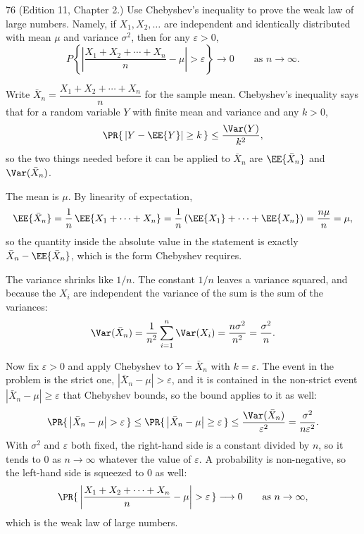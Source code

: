 \documentclass[11pt]{article}
\begin{document}

\begin{problem}{76}
  (Edition 11, Chapter 2.) Use Chebyshev's inequality to prove the weak law of
  large numbers. Namely, if $X_1, X_2, \ldots$ are independent and identically
  distributed with mean $\mu$ and variance $\sigma^2$, then for any
  $\varepsilon > 0$,
  \[
    P\left\{ \left| \frac{X_1 + X_2 + \cdots + X_n}{n} - \mu \right|
             > \varepsilon \right\} \to 0
    \qquad \text{as } n \to \infty .
  \]
\end{problem}
Write $\bar{X}_{n} = \dfrac{X_{1} + X_{2} + \cdots + X_{n}}{n}$ for the sample mean.
Chebyshev's inequality says that for a random variable $Y$ with finite mean and variance
and any $k > 0$,
\[
  \PR{\,\left| Y - \EE{Y} \right| \ge k\,} \le \frac{\Var(Y)}{k^{2}} ,
\]
so the two things needed before it can be applied to $\bar{X}_{n}$ are $\EE{\bar{X}_{n}}$
and $\Var(\bar{X}_{n})$.

The mean is $\mu$. By linearity of expectation,
\[
  \EE{\bar{X}_{n}}
    = \frac{1}{n}\,\EE{X_{1} + \cdots + X_{n}}
    = \frac{1}{n}\left( \EE{X_{1}} + \cdots + \EE{X_{n}} \right)
    = \frac{n\mu}{n}
    = \mu ,
\]
so the quantity inside the absolute value in the statement is exactly
$\bar{X}_{n} - \EE{\bar{X}_{n}}$, which is the form Chebyshev requires.

The variance shrinks like $1/n$. The constant $1/n$ leaves a variance squared, and because
the $X_{i}$ are independent the variance of the sum is the sum of the variances:
\[
  \Var(\bar{X}_{n})
    = \frac{1}{n^{2}} \sum_{i=1}^{n} \Var(X_{i})
    = \frac{n\sigma^{2}}{n^{2}}
    = \frac{\sigma^{2}}{n} .
\]

Now fix $\varepsilon > 0$ and apply Chebyshev to $Y = \bar{X}_{n}$ with $k = \varepsilon$.
The event in the problem is the strict one, $\left| \bar{X}_{n} - \mu \right| >
\varepsilon$, and it is contained in the non-strict event $\left| \bar{X}_{n} - \mu \right|
\ge \varepsilon$ that Chebyshev bounds, so the bound applies to it as well:
\[
  \PR{\,\left| \bar{X}_{n} - \mu \right| > \varepsilon\,}
    \le \PR{\,\left| \bar{X}_{n} - \mu \right| \ge \varepsilon\,}
    \le \frac{\Var(\bar{X}_{n})}{\varepsilon^{2}}
    = \frac{\sigma^{2}}{n\varepsilon^{2}} .
\]
With $\sigma^{2}$ and $\varepsilon$ both fixed, the right-hand side is a constant divided
by $n$, so it tends to $0$ as $n \to \infty$ whatever the value of $\varepsilon$. A
probability is non-negative, so the left-hand side is squeezed to $0$ as well:
\[
  \PR{\,\left| \frac{X_{1} + X_{2} + \cdots + X_{n}}{n} - \mu \right| > \varepsilon\,}
    \longrightarrow 0
  \qquad \text{as } n \to \infty ,
\]
which is the weak law of large numbers.
\end{document}
